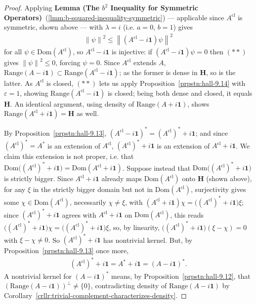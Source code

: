 \begin{proof}
Applying \textbf{Lemma (The $b^2$ Inequality for Symmetric Operators)}~(\ref{lmm:b-squared-inequality-symmetric}) — applicable since $A^{\text{cl}}$ is symmetric, shown above — with $\lambda = i$ (i.e. $a=0$, $b=1$) gives
\begin{align}
    \left\| \psi \right\|^2 \le \left\| (A^{\text{cl}} - i\mathbf{1})\psi \right\|^2 \tag{$\ast\ast$}
\end{align}
for all $\psi \in \text{Dom}(A^{\text{cl}})$, so $A^{\text{cl}} - i\mathbf{1}$ is injective: if $(A^{\text{cl}} - i\mathbf{1})\psi = 0$ then $(\ast\ast)$ gives $\left\| \psi \right\|^2 \le 0$, forcing $\psi = 0$. Since $A^{\text{cl}}$ extends $A$, $\text{Range}(A - i\mathbf{1}) \subset \text{Range}(A^{\text{cl}} - i\mathbf{1})$; as the former is dense in $\mathbf{H}$, so is the latter. As $A^{\text{cl}}$ is closed, $(\ast\ast)$ lets us apply Proposition~\ref{prpstn:hall-9.14} with $\varepsilon = 1$, showing $\text{Range}(A^{\text{cl}} - i\mathbf{1})$ is closed; being both dense and closed, it equals $\mathbf{H}$. An identical argument, using density of $\text{Range}(A + i\mathbf{1})$, shows $\text{Range}(A^{\text{cl}} + i\mathbf{1}) = \mathbf{H}$ as well.

By Proposition~\ref{prpstn:hall-9.13}, $(A^{\text{cl}} - i\mathbf{1})^* = (A^{\text{cl}})^* + i\mathbf{1}$; and since $(A^{\text{cl}})^* = A^*$ is an extension of $A^{\text{cl}}$, $(A^{\text{cl}})^* + i\mathbf{1}$ is an extension of $A^{\text{cl}} + i\mathbf{1}$. We claim this extension is not proper, i.e. that $\text{Dom}\big( (A^{\text{cl}})^* + i\mathbf{1} \big) = \text{Dom}(A^{\text{cl}} + i\mathbf{1})$. Suppose instead that $\text{Dom}\big( (A^{\text{cl}})^* + i\mathbf{1} \big)$ is strictly bigger. Since $A^{\text{cl}} + i\mathbf{1}$ already maps $\text{Dom}(A^{\text{cl}})$ onto $\mathbf{H}$ (shown above), for any $\xi$ in the strictly bigger domain but not in $\text{Dom}(A^{\text{cl}})$, surjectivity gives some $\chi \in \text{Dom}(A^{\text{cl}})$, necessarily $\chi \ne \xi$, with $(A^{\text{cl}} + i\mathbf{1})\chi = \big( (A^{\text{cl}})^* + i\mathbf{1} \big)\xi$; since $(A^{\text{cl}})^* + i\mathbf{1}$ agrees with $A^{\text{cl}} + i\mathbf{1}$ on $\text{Dom}(A^{\text{cl}})$, this reads $\big( (A^{\text{cl}})^* + i\mathbf{1} \big)\chi = \big( (A^{\text{cl}})^* + i\mathbf{1} \big)\xi$, so, by linearity, $\big( (A^{\text{cl}})^* + i\mathbf{1} \big)(\xi - \chi) = 0$ with $\xi - \chi \ne 0$. So $(A^{\text{cl}})^* + i\mathbf{1}$ has nontrivial kernel. But, by Proposition~\ref{prpstn:hall-9.13} once more,
\begin{align}
    (A^{\text{cl}})^* + i\mathbf{1} = A^* + i\mathbf{1} = (A - i\mathbf{1})^*.
\end{align}
A nontrivial kernel for $(A - i\mathbf{1})^*$ means, by Proposition~\ref{prpstn:hall-9.12}, that $\left( \text{Range}(A - i\mathbf{1}) \right)^\perp \ne \{0\}$, contradicting density of $\text{Range}(A - i\mathbf{1})$ by Corollary~\ref{crllr:trivial-complement-characterizes-density}.


\end{proof}
